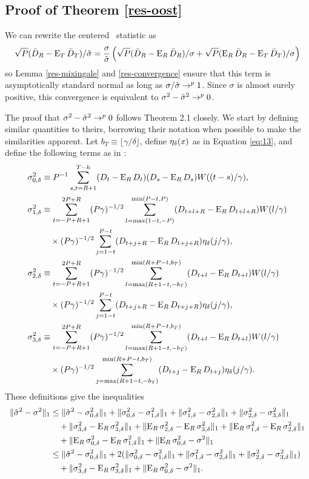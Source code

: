 \documentclass[12pt]{article}
\begin{document}
\subsection*{Proof of Theorem \ref{res-oost}}
We can rewrite the centered \oost\ statistic as
\[
\sqrt{P}(\oosA - \E_T \oosB)/\sh
= \frac{\sigma}{\sh}\, \Big( \sqrt{P}(\oosA - \E_R \oosA)/\sigma
+ \sqrt{P}(\E_R \oosA - \E_T \oosB)/\sigma \Big)
\]
so Lemma \ref{res-mixingale} and \ref{res-convergence} ensure that
this term is asymptotically standard normal as long as $\sigma/\sh
\to^p 1$. Since $\sigma$ is almost surely positive, this convergence
is equivalent to $\sigma^2 - \sh^2 \to^p 0$.

The proof that $\sigma^2 - \sh^2 \to^p 0$ follows 
Theorem 2.1 closely.  We start by defining similar quantities to
theirs, borrowing their notation when possible to make the
similarities apparent. Let $b_T \equiv \lfloor \gamma/\delta \rfloor$,
define $\kernelB{x}$ as in Equation \eqref{eq:13}, and define the following
terms as in \citet{JoD:00}:
\begin{align*}
  \varianceTermI &\equiv
  \varianceTermIDefn,\\ \varianceTermII &\equiv \vtSum
  \varianceTermIIa\\& \quad \times \varianceTermIIb,\\
  \varianceTermIII &\equiv \vtSum \varianceTermIIIa\\
  &\quad \times \varianceTermIIb,\\
  \varianceTermIV &\equiv \vtSum \varianceTermIIIa \\
  &\quad\times \varianceTermIVb.
\end{align*}
These definitions give the inequalities
\begin{align*}
  \lVert \sh^2 - \sigma^2 \rVert_1 &
  \leq \lVert \sh^2 - \varianceTermI \rVert_1
  + \lVert \varianceTermI - \varianceTermII \rVert_1
  + \lVert \varianceTermII - \varianceTermIII \rVert_1
  + \lVert \varianceTermIII - \varianceTermIV \rVert_1\\ & \quad
  + \lVert \varianceTermIV - \E_R \varianceTermIV \rVert_1
  + \lVert \E_R\varianceTermIII - \E_R\varianceTermIV \rVert_1
  + \lVert \E_R\varianceTermII - \E_R\varianceTermIII \rVert_1\\ & \quad
  + \lVert \E_R\varianceTermI - \E_R\varianceTermII \rVert_1
  + \lVert \E_R \varianceTermI - \sigma^2 \rVert_1
  \\ &
  \leq  \lVert \sh^2 - \varianceTermI \rVert_1
  + 2(\lVert \varianceTermI - \varianceTermII \rVert_1
      + \lVert \varianceTermII - \varianceTermIII \rVert_1
      + \lVert \varianceTermIII - \varianceTermIV \rVert_1) \\
  & \quad + \lVert \varianceTermIV - \E_R \varianceTermIV \rVert_1
  + \lVert \E_R \varianceTermI - \sigma^2 \rVert_1.
\end{align*}
\end{document}
